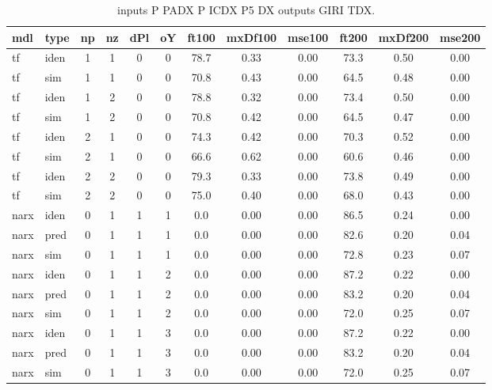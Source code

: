 \begin{center} 
\begin{longtable}{ll|cccc|ccc|ccc} 
\caption[inputs P PADX P ICDX P5 DX   outputs GIRI TDX]{inputs P PADX P ICDX P5 DX   outputs GIRI TDX.} 
\label{tab:inputs_P_PADX_P_ICDX_P5_DX___outputs_GIRI_TDX} 
\hline 
  mdl & type & np & nz & dPl & oY & ft100 & mxDf100 & mse100 & ft200 & mxDf200 & mse200 \\ 
 \hline 
tf  & iden & 1 & 1 & 0 & 0 & 78.7 & 0.33 & 0.00 & 73.3 & 0.50 & 0.00 \\ 
tf  & sim & 1 & 1 & 0 & 0 & 70.8 & 0.43 & 0.00 & 64.5 & 0.48 & 0.00 \\ 
 \hline 
tf  & iden & 1 & 2 & 0 & 0 & 78.8 & 0.32 & 0.00 & 73.4 & 0.50 & 0.00 \\ 
tf  & sim & 1 & 2 & 0 & 0 & 70.8 & 0.42 & 0.00 & 64.5 & 0.47 & 0.00 \\ 
 \hline 
tf  & iden & 2 & 1 & 0 & 0 & 74.3 & 0.42 & 0.00 & 70.3 & 0.52 & 0.00 \\ 
tf  & sim & 2 & 1 & 0 & 0 & 66.6 & 0.62 & 0.00 & 60.6 & 0.46 & 0.00 \\ 
 \hline 
tf  & iden & 2 & 2 & 0 & 0 & 79.3 & 0.33 & 0.00 & 73.8 & 0.49 & 0.00 \\ 
tf  & sim & 2 & 2 & 0 & 0 & 75.0 & 0.40 & 0.00 & 68.0 & 0.43 & 0.00 \\ 
 \hline 
narx & iden & 0 & 1 & 1 & 1 & 0.0 & 0.00 & 0.00 & 86.5 & 0.24 & 0.00 \\ 
narx & pred & 0 & 1 & 1 & 1 & 0.0 & 0.00 & 0.00 & 82.6 & 0.20 & 0.04 \\ 
narx & sim & 0 & 1 & 1 & 1 & 0.0 & 0.00 & 0.00 & 72.8 & 0.23 & 0.07 \\ 
 \hline 
narx & iden & 0 & 1 & 1 & 2 & 0.0 & 0.00 & 0.00 & 87.2 & 0.22 & 0.00 \\ 
narx & pred & 0 & 1 & 1 & 2 & 0.0 & 0.00 & 0.00 & 83.2 & 0.20 & 0.04 \\ 
narx & sim & 0 & 1 & 1 & 2 & 0.0 & 0.00 & 0.00 & 72.0 & 0.25 & 0.07 \\ 
 \hline 
narx & iden & 0 & 1 & 1 & 3 & 0.0 & 0.00 & 0.00 & 87.2 & 0.22 & 0.00 \\ 
narx & pred & 0 & 1 & 1 & 3 & 0.0 & 0.00 & 0.00 & 83.2 & 0.20 & 0.04 \\ 
narx & sim & 0 & 1 & 1 & 3 & 0.0 & 0.00 & 0.00 & 72.0 & 0.25 & 0.07 \\ 
 \hline 
\end{longtable} 
\end{center}